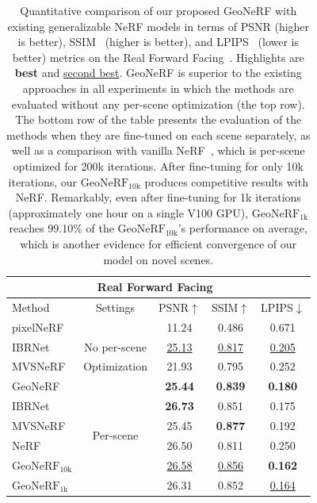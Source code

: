 \begin{table}[!t]
    \begin{center}
        \begin{threeparttable}
            \begin{tabular}{l|c|ccc}
            \hline
            \multicolumn{5}{c}{Real Forward Facing~\cite{mildenhall2019llff}} \\
            \hline
            Method & Settings & PSNR$\uparrow$ & SSIM$\uparrow$ & LPIPS$\downarrow$ \\
            \hline
            pixelNeRF~\cite{yu2021pixelnerf} &  & 11.24 & 0.486 & 0.671 \\
            IBRNet~\cite{wang2021ibrnet} & No per-scene & \underline{25.13} & \underline{0.817} & \underline{0.205} \\
            MVSNeRF~\cite{chen2021mvsnerf} & Optimization & 21.93 & 0.795 & 0.252 \\
            GeoNeRF &  & \textbf{25.44} & \textbf{0.839} & \textbf{0.180} \\
            \hline
            IBRNet~\cite{wang2021ibrnet} &  & \textbf{26.73} & 0.851 & 0.175 \\
            MVSNeRF~\cite{chen2021mvsnerf} & \multirow{2}{*}{Per-scene} & 25.45 & \textbf{0.877} & 0.192 \\
            NeRF~\cite{mildenhall2020nerf} & \multirow{2}{*}{Optimization} & 26.50 & 0.811 & 0.250 \\
            $\text{GeoNeRF}_{\text{10k}}$ &  & \underline{26.58} & \underline{0.856} & \textbf{0.162} \\
            $\text{GeoNeRF}_{\text{1k}}$ &  & 26.31 & 0.852 & \underline{0.164} \\
            \hline
            \end{tabular}
        \end{threeparttable}
    \end{center}
    \caption{Quantitative comparison of our proposed GeoNeRF with existing generalizable NeRF models in terms of PSNR (higher is better), SSIM~\cite{wang2004image} (higher is better), and LPIPS~\cite{zhang2018unreasonable} (lower is better) metrics on the Real Forward Facing~\cite{mildenhall2019llff}. Highlights are \textbf{best} and \underline{second best}. GeoNeRF is superior to the existing approaches in all experiments in which the methods are evaluated without any per-scene optimization (the top row). The bottom row of the table presents the evaluation of the methods when they are fine-tuned on each scene separately, as well as a comparison with vanilla NeRF~\cite{mildenhall2020nerf}, which is per-scene optimized for 200k iterations. After fine-tuning for only 10k iterations, our $\text{GeoNeRF}_{\text{10k}}$ produces competitive results with NeRF. Remarkably, even after fine-tuning for 1k iterations (approximately one hour on a single V100 GPU), $\text{GeoNeRF}_{\text{1k}}$ reaches 99.10\% of the $\text{GeoNeRF}_{\text{10k}}$'s performance on average, which is another evidence for efficient convergence of our model on novel scenes.}
    \label{table:quantitative_llff}
\end{table}

